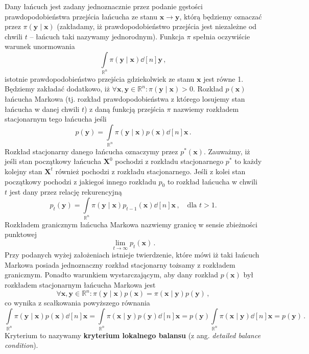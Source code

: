 \documentclass{myclass}
\numberwithin{equation}{subsection}
\begin{document}
Dany łańcuch jest zadany jednoznacznie przez
podanie gęstości prawdopodobieństwa przejścia łańcucha ze stanu \(\mathbf{x} \to \mathbf{y}\), którą
będziemy oznaczać przez \(\pi(\mathbf{y} \mid \mathbf{x})\) (zakładamy, iż prawdopodobieństwo
przejścia jest niezależne od chwili \(t\) -- łańcuch taki nazywamy jednorodnym). Funkcja \(\pi\)
spełnia oczywiście warunek unormowania
\begin{equation}
    \int\limits_{\mathbb{R}^n} \pi(\mathbf{y} \mid \mathbf{x}) \dd[n]{\mathbf{y}}\,,
\end{equation} 
istotnie prawdopodobieństwo przejścia gdziekolwiek ze stanu \(\mathbf{x}\) jest równe 1. Będziemy
zakładać dodatkowo, iż \(\forall \mathbf{x},\mathbf{y}\in\mathbb{R}^n: \pi(\mathbf{y} \mid
\mathbf{x}) > 0\). Rozkład \(p(\mathbf{x})\) łańcucha Markowa (tj. rozkład prawdopodobieństwa z
którego losujemy stan łańcucha w danej chwili \(t\)) z daną funkcją przejścia \(\pi\) nazwiemy
rozkładem stacjonarnym tego łańcucha jeśli
\begin{equation}
    p(\mathbf{y}) = \int\limits_{\mathbb{R}^n} \pi(\mathbf{y} \mid \mathbf{x})p(\mathbf{x}) \dd[n]{\mathbf{x}}\,.
\end{equation}
Rozkład stacjonarny danego łańcucha oznaczymy przez \(p^*(\mathbf{x})\). Zauważmy, iż jeśli stan
początkowy łańcucha \(\mathbf{X}^0\) pochodzi z rozkładu stacjonarnego \(p^*\) to każdy kolejny stan
\(\mathbf{X}^t\) również pochodzi z rozkładu stacjonarnego. Jeśli z kolei stan początkowy pochodzi z
jakiegoś innego rozkładu \(p_0\) to rozkład łańcucha w chwili \(t\) jest dany przez relację
rekurencyjną
\begin{equation}
    p_t(\mathbf{y}) = \int\limits_{\mathbb{R}^n} \pi(\mathbf{y} \mid \mathbf{x})p_{t-1}(\mathbf{x}) \dd[n]{\mathbf{x}}\,,\quad\text{dla \(t > 1\).}
\end{equation}
Rozkładem granicznym łańcucha Markowa nazwiemy granicę w sensie zbieżności punktowej
\begin{equation}
    \lim_{t\to\infty} p_t(\mathbf{x})\,.
\end{equation}
Przy podanych wyżej założeniach istnieje twierdzenie, które mówi iż taki łańcuch Markowa posiada
jednoznaczny rozkład stacjonarny tożsamy z rozkładem granicznym. Ponadto warunkiem wystarczającym,
aby dany rozkład \(p(\mathbf{x})\) był rozkładem stacjonarnym łańcucha Markowa jest
\begin{equation}
    \forall\mathbf{x}, \mathbf{y} \in \mathbb{R}^n: \pi(\mathbf{y}\mid\mathbf{x}) p(\mathbf{x}) = \pi(\mathbf{x} \mid \mathbf{y}) p(\mathbf{y})\,,
\end{equation}
co wynika z scałkowania powyższego równania
\begin{equation}
    \int\limits_{\mathbb{R}^n} \pi(\mathbf{y}\mid\mathbf{x}) p(\mathbf{x}) \dd[n]{\mathbf{x}} = \int\limits_{\mathbb{R}^n} \pi(\mathbf{x} \mid \mathbf{y}) p(\mathbf{y}) \dd[n]{\mathbf{x}} = p(\mathbf{y}) \int\limits_{\mathbb{R}^n} \pi(\mathbf{x} \mid \mathbf{y}) \dd[n]{\mathbf{x}} = p(\mathbf{y})\,.
\end{equation}
Kryterium to nazywamy \textbf{kryterium lokalnego balansu} (z ang. \textit{detailed balance
condition}).
\end{document}
